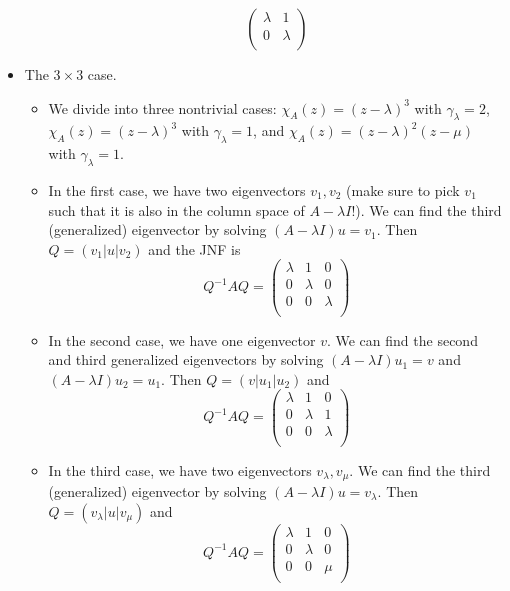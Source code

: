 \documentclass[../notes.tex]{subfiles}
\begin{document}
\begin{itemize}
\begin{itemize}
\begin{equation*}
\begin{pmatrix}
                \lambda & 1\\
                0 & \lambda\\
            \end{pmatrix}
        \end{equation*}
    \end{itemize}
    \item The $3\times 3$ case.
    \begin{itemize}
        \item We divide into three nontrivial cases: $\chi_A(z)=(z-\lambda)^3$ with $\gamma_\lambda=2$, $\chi_A(z)=(z-\lambda)^3$ with $\gamma_\lambda=1$, and $\chi_A(z)=(z-\lambda)^2(z-\mu)$ with $\gamma_\lambda=1$.
        \item In the first case, we have two eigenvectors $v_1,v_2$ (make sure to pick $v_1$ such that it is also in the column space of $A-\lambda I$!). We can find the third (generalized) eigenvector by solving $(A-\lambda I)u=v_1$. Then $Q=(v_1|u|v_2)$ and the JNF is
        \begin{equation*}
            Q^{-1}AQ =
            \begin{pmatrix}
                \lambda & 1 & 0\\
                0 & \lambda & 0\\
                0 & 0 & \lambda\\
            \end{pmatrix}
        \end{equation*}
        \item In the second case, we have one eigenvector $v$. We can find the second and third generalized eigenvectors by solving $(A-\lambda I)u_1=v$ and $(A-\lambda I)u_2=u_1$. Then $Q=(v|u_1|u_2)$ and
        \begin{equation*}
            Q^{-1}AQ =
            \begin{pmatrix}
                \lambda & 1 & 0\\
                0 & \lambda & 1\\
                0 & 0 & \lambda\\
            \end{pmatrix}
        \end{equation*}
        \item In the third case, we have two eigenvectors $v_\lambda,v_\mu$. We can find the third (generalized) eigenvector by solving $(A-\lambda I)u=v_\lambda$. Then $Q=(v_\lambda|u|v_\mu)$ and
        \begin{equation*}
            Q^{-1}AQ =
            \begin{pmatrix}
                \lambda & 1 & 0\\
                0 & \lambda & 0\\
                0 & 0 & \mu\\
            \end{pmatrix}
        \end{equation*}
    \end{itemize}
\end{itemize}
\end{document}
